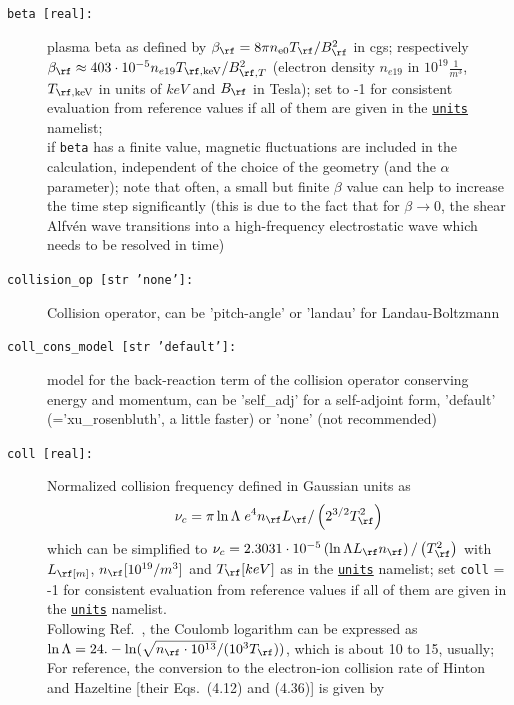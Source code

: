 \documentclass[12pt]{article}
\begin{document}
\begin{description}
\item[\hypertarget{beta}{\tt beta [real]:}] plasma beta as defined by $\beta_\rf=8\pi
  n_{\mathrm{e}0}T_\rf/B_\rf^2$ in cgs; respectively
  $\beta_\rf\approx 403\cdot 10^{-5} n_{e19} T_{\rf ,\mathrm{keV}}/B_{\rf ,T}^2$
(electron density $n_{e19}$ in $10^{19}\frac{1}{m^3}$, $T_{\rf ,\mathrm{keV}}$ in units of $keV$ and
$B_\rf$ in Tesla); set to -1 for consistent evaluation from reference values if all of them are given
in the \hyperlink{units_nml}{\tt units} namelist;\\
 if {\tt beta} has a finite value, magnetic fluctuations are included
  in the calculation, independent of the choice of the geometry (and the $\alpha$ parameter); note
  that often, a small but finite $\beta$ value can help to increase the time step significantly (this
  is due to the fact that for $\beta\rightarrow 0$, the shear Alfv\'en wave transitions into a
  high-frequency electrostatic wave which needs to be resolved in time)
\item[\texttt{collision\_op [str 'none']:}] Collision operator, can be 'pitch-angle' or 'landau' for Landau-Boltzmann
\item[\texttt{coll\_cons\_model [str 'default']:}] model for the back-reaction term of the collision operator conserving energy and momentum,
can be 'self\_adj' for a self-adjoint form, 'default'
(='xu\_rosenbluth', a little faster) or 'none' (not recommended)
\item[\hypertarget{coll}{\tt coll [real]:}] Normalized collision
frequency defined in Gaussian units as $$\nu_c=\pi \ln\Lambda\; e^4 n_\rf L_\rf/\left(2^{3/2}T_\rf^2\right)$$ which can be simplified to
$\nu_c = 2.3031\cdot 10^{-5}\left(\ln \Lambda L_\rf n_{\rf}\right)/\left(T_{\rf}^2\right)$
with $L_\rf[m]$, $n_{\rf}[10^{19}/m^3]$ and $T_{\rf}[keV]$ as in the \hyperlink{units_nml}{\tt units} namelist;
set {\tt coll} = -1 for consistent evaluation from reference values if all of
them are given in the \hyperlink{units_nml}{\tt units} namelist. \\
Following Ref.~\cite{nrlformulary}, the Coulomb logarithm can be expressed as
$\ln\Lambda=24.-\ln(\sqrt{n_{\rf}\cdot10^{13}}/(10^3 T_{\rf}))$, which is
about 10 to 15, usually;\\
For reference, the conversion to the electron-ion collision rate of Hinton and
Hazeltine\cite{HintonHazeltine1976} [their Eqs.~(4.12) and (4.36)] is given by
\begin{align*}

\end{align*}
\end{description}
\end{document}
